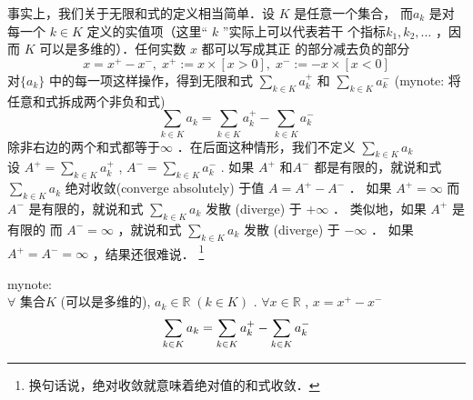 \documentclass[mode=geye, chinesefont=founder]{elegantnote}
\newcommand\tikznode[3][]%
{\tikz[remember picture,baseline=(#2.base)]
	\node[minimum size=0pt,inner sep=0pt,#1](#2){#3};%
}
\begin{document}
事实上，我们关于无限和式的定义相当简单．设 $ K $  是任意一个集合，
而$ a_k $  是对每一个 $ k\in K $ 定义的实值项（这里“ $ k $  ”实际上可以代表若干
个指标$ k_1,k_2,\dots $  ，因而 $ K $ 可以是多维的）．任何实数 $ x $ 都可以写成其正
的部分减去负的部分
\begin{equation*}
    x=x^+-x^-,\; x^+:= x\times [x>0],\; x^- := -x\times [x<0]
\end{equation*}
对$ \{a_k\} $ 中的每一项这样操作，得到无限和式 $ \sum_{k\in K}a_k^+ $ 和 $ \sum_{k\in K}a_k^- $ (mynote: 将任意和式拆成两个非负和式)
\begin{equation}
     \sum_{k\in K}a_k =  \sum_{k\in K}a_k^+ -  \sum_{k\in K}a_k^-
\end{equation}
除非右边的两个和式都等于$ \infty $  ．在后面这种情形，我们不定义 $ \sum_{k\in K}a_k  $ \\
设 
$ A^+ = \sum_{k\in K}a_k^+  $ , 
$ A^- = \sum_{k\in K}a_k^-  $ . 
如果 $ A^+ $ 和$ A^- $ 都是有限的，就说和式 $ \sum_{k\in K}a_k  $ 绝对收敛(converge absolutely) 于值 $ A= A^+-A^- $ ．
如果 $ A^+=\infty $ 而 $ A^- $ 是有限的，就说和式 $ \sum_{k\in K}a_k  $ 发散 (diverge) 于 $ +\infty $ ．
类似地，如果 $ A^+ $ 是有限的 而 $ A^-=\infty $ ，就说和式 $ \sum_{k\in K}a_k  $ 发散 (diverge) 于 $ -\infty $ ．
如果 $ A^+ = A^-=\infty $ ，结果还很难说．
\footnote{换句话说，绝对收敛就意味着绝对值的和式收敛．}

mynote:\\
$ \forall $ 集合$ K $ (可以是多维的), $ a_k\in \mathbb{R} \;(k\in K) $ . $ \forall x\in\mathbb{R} $ , $ x = x^+-x^- $ 
\begin{equation*}
    \sum_{k\in K}a_k = \sum_{k\in K}\tikznode{ak1}{$ a_k^+ $ } - \sum_{k\in K}\tikznode{ak2}{$ a_k^- $ }
\end{equation*}

\end{document}
